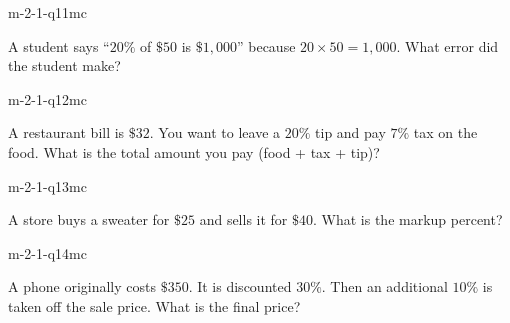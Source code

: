 \begin{practiceQuestion}{m-2-1-q11}{mc}
\begin{questionText}
A student says ``$20\%$ of $\$50$ is $\$1{,}000$'' because $20 \times 50 = 1{,}000$. What error did the student make?
\end{questionText}
\end{practiceQuestion}

\begin{practiceQuestion}{m-2-1-q12}{mc}
\begin{questionText}
A restaurant bill is $\$32$. You want to leave a $20\%$ tip and pay $7\%$ tax on the food. What is the total amount you pay (food + tax + tip)?
\end{questionText}
\end{practiceQuestion}

\begin{practiceQuestion}{m-2-1-q13}{mc}
\begin{questionText}
A store buys a sweater for $\$25$ and sells it for $\$40$. What is the markup percent?
\end{questionText}
\end{practiceQuestion}

\begin{practiceQuestion}{m-2-1-q14}{mc}
\begin{questionText}
A phone originally costs $\$350$. It is discounted $30\%$. Then an additional $10\%$ is taken off the sale price. What is the final price?
\end{questionText}
\end{practiceQuestion}

